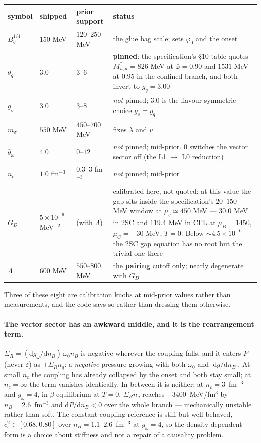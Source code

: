 \documentclass[11pt,a4paper]{article}
\newcommand{\phib}{\bar\varphi}
\newcommand{\Mstar}{M^{*}}
\begin{document}
\begin{center}
\begin{tabular}{lllp{5.3cm}}
\toprule
symbol & shipped & prior support & status \\
\midrule
$B_g^{1/4}$ & $150$ MeV & $120$--$250$ MeV
 & the glue bag scale; sets $\varphi_0$ and the onset \\
$g_q$ & $3.0$ & $3$--$6$
 & \textbf{pinned}: the specification's \S10 table quotes
   $\Mstar_{u,d}=826$ MeV at $\phib=0.90$ and $1531$ MeV at $0.95$ in the
   confined branch, and both invert to $g_q=3.00$ \\
$g_s$ & $3.0$ & $3$--$8$
 & \emph{not} pinned; $3.0$ is the flavour-symmetric choice $g_s=g_q$ \\
$m_\sigma$ & $550$ MeV & $450$--$700$ MeV & fixes $\lambda$ and $v$ \\
$\bar g_\omega$ & $4.0$ & $0$--$12$
 & \emph{not} pinned; mid-prior. $0$ switches the vector sector off (the
   L1 $\to$ L0 reduction) \\
$n_c$ & $1.0$ fm$^{-3}$ & $0.3$--$3$ fm$^{-3}$
 & \emph{not} pinned; mid-prior \\
$G_D$ & $5\times10^{-6}$ MeV$^{-2}$ & (with $\Lambda$) 
 & calibrated here, not quoted: at this value the gap sits inside the
   specification's $20$--$150$ MeV window at $\mu_q\simeq450$ MeV --- $30.0$
   MeV in 2SC and $119.4$ MeV in CFL at $\mu_B=1450$, $\mu_C=-30$ MeV,
   $T=0$. Below $\sim4.5\times10^{-6}$ the 2SC gap equation has no root but
   the trivial one there \\
$\Lambda$ & $600$ MeV & $550$--$800$ MeV
 & the \textbf{pairing} cutoff only; nearly degenerate with $G_D$ \\
\bottomrule
\end{tabular}
\end{center}

Three of these eight are calibration knobs at mid-prior values rather than
measurements, and the code says so rather than dressing them otherwise.
\paragraph{The vector sector has an awkward middle, and it is the
rearrangement term.} $\Sigma_R=(\mathrm{d}g_\omega/\mathrm{d}n_B)\,\omega_0
n_B$ is negative wherever the coupling falls, and it enters $P$ (never
$\varepsilon$) as $+\Sigma_R n_q$: a \emph{negative} pressure growing with
both $\omega_0$ and $|\mathrm{d}g/\mathrm{d}n_B|$. At small $n_c$ the coupling
has already collapsed by the onset and both stay small; at $n_c=\infty$ the
term vanishes identically. In between it is neither: at $n_c=3$~fm$^{-3}$ and
$\bar g_\omega=4$, in $\beta$ equilibrium at $T=0$, $\Sigma_R n_q$ reaches
$-3400$~MeV/fm$^3$ by $n_B=2.6$~fm$^{-3}$ and $\mathrm{d}P/\mathrm{d}n_B<0$
over the whole branch --- mechanically unstable rather than soft. The
constant-coupling reference is stiff but well behaved, $c_s^2\in[0.68,0.80]$
over $n_B=1.1$--$2.6$~fm$^{-3}$ at $\bar g_\omega=4$, so the density-dependent
form is a choice about stiffness and not a repair of a causality problem.
\end{document}
